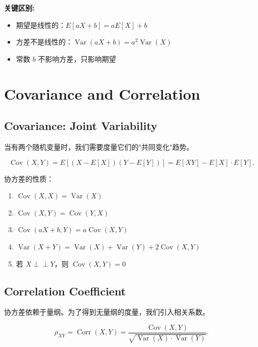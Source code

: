 \textbf{关键区别:}
\begin{itemize}
    \item 期望是线性的：$E[aX + b] = aE[X] + b$
    \item 方差不是线性的：$\operatorname{Var}(aX + b) = a^2 \operatorname{Var}(X)$
    \item 常数 $b$ 不影响方差，只影响期望
\end{itemize}

\section{Covariance and Correlation}\label{sec:covariance-correlation}

\subsection{Covariance: Joint Variability}\label{sub:covariance}

当有两个随机变量时，我们需要度量它们的"共同变化"趋势。

\begin{Definition}[协方差]\label{def:covariance}
\[
\operatorname{Cov}(X, Y) = E[(X - E[X])(Y - E[Y])] = E[XY] - E[X] \cdot E[Y].
\]
\end{Definition}

协方差的性质：
\begin{enumerate}
    \item $\operatorname{Cov}(X, X) = \operatorname{Var}(X)$
    \item $\operatorname{Cov}(X, Y) = \operatorname{Cov}(Y, X)$
    \item $\operatorname{Cov}(aX + b, Y) = a \operatorname{Cov}(X, Y)$
    \item $\operatorname{Var}(X + Y) = \operatorname{Var}(X) + \operatorname{Var}(Y) + 2\operatorname{Cov}(X, Y)$
    \item 若 $X \perp\!\!\!\perp Y$，则 $\operatorname{Cov}(X, Y) = 0$
\end{enumerate}

\subsection{Correlation Coefficient}\label{sub:correlation}

协方差依赖于量纲。为了得到无量纲的度量，我们引入相关系数。

\begin{Definition}[相关系数]\label{def:correlation}
\[
\rho_{XY} = \operatorname{Corr}(X, Y) = \frac{\operatorname{Cov}(X, Y)}{\sqrt{\operatorname{Var}(X) \cdot \operatorname{Var}(Y)}}.
\]
\end{Definition}

